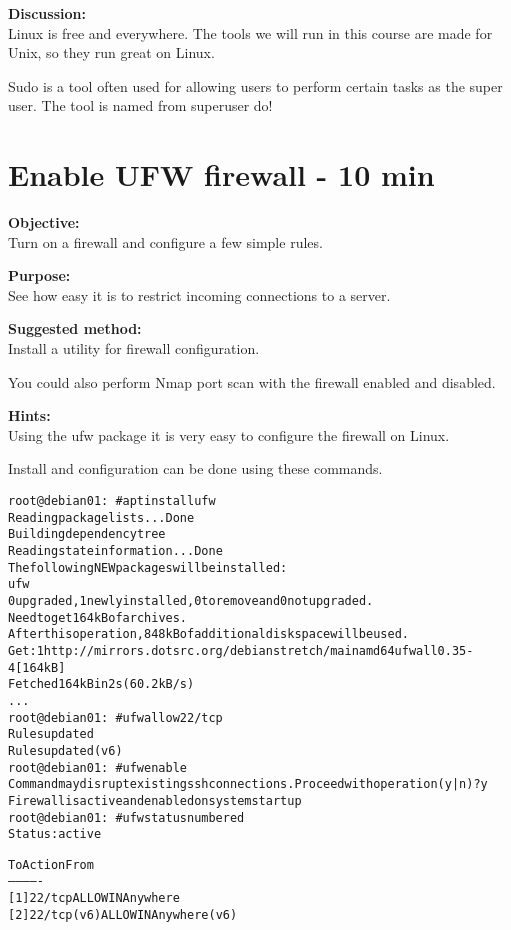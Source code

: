 \documentclass[a4paper,11pt,notitlepage]{report}
\begin{document}
{\bf Discussion:}\\
Linux is free and everywhere. The tools we will run in this course are made for Unix, so they run great on Linux.

Sudo is a tool often used for allowing users to perform certain tasks as the super user. The tool is named from superuser do! 


\chapter{Enable UFW firewall - 10 min}
\label{ex:debian-firewall}

{\bf Objective:}\\
Turn on a firewall and configure a few simple rules.

{\bf Purpose:}\\
See how easy it is to restrict incoming connections to a server.


{\bf Suggested method:}\\
Install a utility for firewall configuration.

You could also perform Nmap port scan with the firewall enabled and disabled.

{\bf Hints:}\\
Using the ufw package it is very easy to configure the firewall on Linux.

Install and configuration can be done using these commands.
\begin{alltt}
root@debian01:~# apt install ufw
Reading package lists... Done
Building dependency tree
Reading state information... Done
The following NEW packages will be installed:
  ufw
0 upgraded, 1 newly installed, 0 to remove and 0 not upgraded.
Need to get 164 kB of archives.
After this operation, 848 kB of additional disk space will be used.
Get:1 http://mirrors.dotsrc.org/debian stretch/main amd64 ufw all 0.35-4 [164 kB]
Fetched 164 kB in 2s (60.2 kB/s)
...
root@debian01:~# ufw allow 22/tcp
Rules updated
Rules updated (v6)
root@debian01:~# ufw enable
Command may disrupt existing ssh connections. Proceed with operation (y|n)? y
Firewall is active and enabled on system startup
root@debian01:~# ufw status numbered
Status: active

     To                         Action      From
     --                         ------      ----
[ 1] 22/tcp                     ALLOW IN    Anywhere
[ 2] 22/tcp (v6)                ALLOW IN    Anywhere (v6)
\end{alltt}
\end{document}
